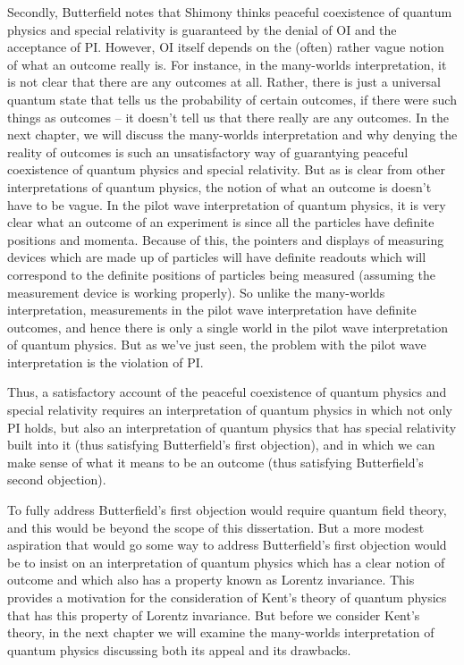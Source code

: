Secondly,  Butterfield notes that Shimony thinks peaceful coexistence of quantum physics and special relativity is guaranteed by the denial of OI and the acceptance of PI. However, OI itself depends on the (often) rather vague notion of what an outcome really is. For instance, in the many-worlds interpretation, it is not clear that there are any outcomes at all. Rather, there is just a universal quantum state that tells us the probability of certain outcomes, if there were such things as outcomes -- it doesn't tell us that there really are any outcomes. In the next chapter, we will discuss the many-worlds interpretation and why denying the reality of outcomes is such an unsatisfactory way of guarantying peaceful coexistence of quantum physics and special relativity. But as is clear from other interpretations of quantum physics, the notion of what an outcome is doesn't have to be vague. In the pilot wave interpretation of quantum physics, it is very clear what an outcome of an experiment is since all the particles have definite positions and momenta. Because of this, the pointers and displays of measuring devices which are made up of particles will have definite readouts which will correspond to the definite positions of particles being measured (assuming the measurement device is working properly). So unlike the many-worlds interpretation, measurements in the pilot wave interpretation have definite outcomes, and hence there is only a single world in the pilot wave interpretation of quantum physics. But as we've just seen, the problem with the pilot wave interpretation is the violation of PI.

Thus, a satisfactory account of the peaceful coexistence of quantum physics and special relativity requires an interpretation of quantum physics in which not only PI holds, but also an interpretation of quantum physics that has special relativity built into it (thus satisfying Butterfield's first objection), and in which we can make sense of what it means to be an outcome (thus satisfying Butterfield's second objection). 

To fully address Butterfield's first objection would require quantum field theory, and this would be beyond the scope of this dissertation. But a more modest aspiration that would go some way to address Butterfield's first objection would be to insist on an interpretation of quantum physics which has a clear notion of outcome and which also has a property known as Lorentz invariance. This provides a motivation for the consideration of Kent's theory of quantum physics that has this property of Lorentz invariance. But before we consider Kent's theory, in the next chapter we will examine the many-worlds interpretation of quantum physics discussing both its appeal and its drawbacks.
